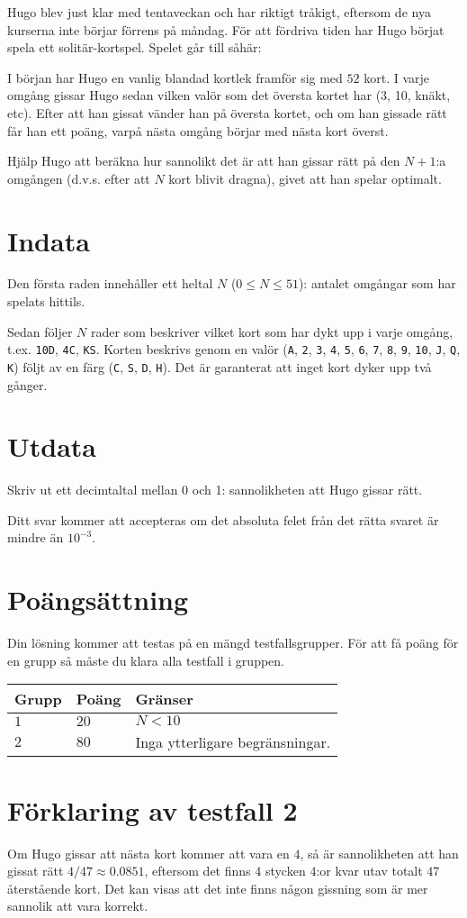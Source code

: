 Hugo blev just klar med tentaveckan och har riktigt tråkigt, eftersom de nya kurserna inte börjar förrens på måndag.
För att fördriva tiden har Hugo börjat spela ett solitär-kortspel. Spelet går till såhär:

I början har Hugo en vanlig blandad kortlek framför sig med $52$ kort. I varje omgång gissar Hugo sedan vilken valör som det översta kortet har (3, 10, knäkt, etc).
Efter att han gissat vänder han på översta kortet, och om han gissade rätt får han ett poäng, varpå nästa omgång börjar med nästa kort överst.

Hjälp Hugo att beräkna hur sannolikt det är att han gissar rätt på den $N+1$:a omgången (d.v.s. efter att $N$ kort blivit dragna),
givet att han spelar optimalt.

\section*{Indata}
Den första raden innehåller ett heltal $N$ ($0 \le N \le 51$): antalet omgångar som har spelats hittils.

Sedan följer $N$ rader som beskriver vilket kort som har dykt upp i varje omgång, t.ex. \texttt{10D}, \texttt{4C}, \texttt{KS}.
Korten beskrivs genom en valör (\texttt{A}, \texttt{2}, \texttt{3}, \texttt{4}, \texttt{5}, \texttt{6}, \texttt{7}, \texttt{8},
\texttt{9}, \texttt{10}, \texttt{J}, \texttt{Q}, \texttt{K}) följt av en färg (\texttt{C}, \texttt{S}, \texttt{D}, \texttt{H}).
Det är garanterat att inget kort dyker upp två gånger.

\section*{Utdata}
Skriv ut ett decimtaltal mellan 0 och 1: sannolikheten att Hugo gissar rätt.

Ditt svar kommer att accepteras om det absoluta felet från det rätta svaret är mindre än $10^{-3}$.

\section*{Poängsättning}
Din lösning kommer att testas på en mängd testfallsgrupper.
För att få poäng för en grupp så måste du klara alla testfall i gruppen.

\noindent
\begin{tabular}{| l | l | p{12cm} |}
  \hline
  \textbf{Grupp} & \textbf{Poäng} & \textbf{Gränser} \\ \hline
  $1$    & $20$       & $N < 10$ \\ \hline
  $2$    & $80$       & Inga ytterligare begränsningar. \\ \hline
\end{tabular}

\section*{Förklaring av testfall 2}
Om Hugo gissar att nästa kort kommer att vara en $4$, så är sannolikheten att han gissat rätt
$4/47 \approx 0.0851$, eftersom det finns $4$ stycken $4$:or kvar utav totalt $47$ återstående kort.
Det kan visas att det inte finns någon gissning som är mer sannolik att vara korrekt.
